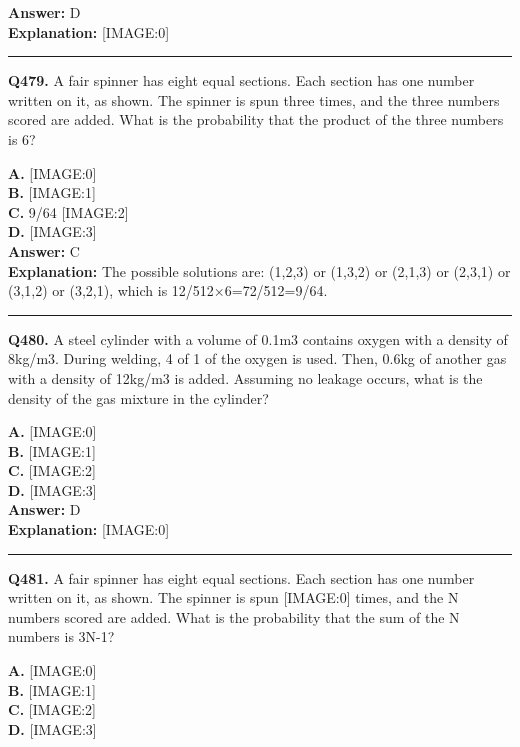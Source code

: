 \documentclass[12pt]{article}
\begin{document}
\textbf{Answer:} D \\
\textbf{Explanation:} [IMAGE:0]

\hrule
\vspace{1em}


\noindent
\textbf{Q479.} A fair spinner has eight equal sections. Each section has one number written on it, as shown.
The spinner is spun three times, and the three numbers scored are added. What is the probability that the product of the three numbers is 6?



\textbf{A.} [IMAGE:0] \\
\textbf{B.} [IMAGE:1] \\
\textbf{C.} 9/64
[IMAGE:2] \\
\textbf{D.} [IMAGE:3] \\

\textbf{Answer:} C \\
\textbf{Explanation:} The possible solutions are: (1,2,3) or (1,3,2) or (2,1,3) or (2,3,1) or (3,1,2) or (3,2,1), which is 12/512×6=72/512=9/64.

\hrule
\vspace{1em}


\noindent
\textbf{Q480.} A steel cylinder with a volume of 0.1m3 contains oxygen with a density of 8kg/m3. During welding, 4 of 1 of the oxygen is used. Then, 0.6kg of another gas with a density of 12kg/m3 is added. Assuming no leakage occurs, what is the density of the gas mixture in the cylinder?



\textbf{A.} [IMAGE:0] \\
\textbf{B.} [IMAGE:1] \\
\textbf{C.} [IMAGE:2] \\
\textbf{D.} [IMAGE:3] \\

\textbf{Answer:} D \\
\textbf{Explanation:} [IMAGE:0]

\hrule
\vspace{1em}


\noindent
\textbf{Q481.} A fair spinner has eight equal sections. Each section has one number written on it, as shown.
The spinner is spun
[IMAGE:0]
times, and the N numbers scored are added. What is the probability that the sum of the N numbers is 3N-1?



\textbf{A.} [IMAGE:0] \\
\textbf{B.} [IMAGE:1] \\
\textbf{C.} [IMAGE:2] \\
\textbf{D.} [IMAGE:3] \\
\end{document}
